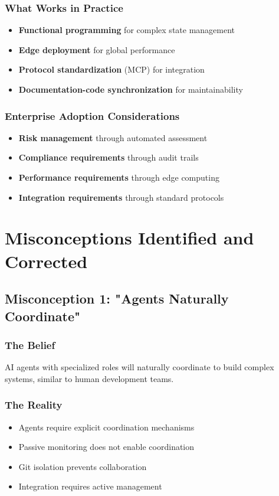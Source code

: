 \documentclass[11pt]{article}
\begin{document}
\subsubsection{What Works in Practice}
\label{sec:org6b02580}
\begin{itemize}
\item \textbf{\textbf{Functional programming}} for complex state management
\item \textbf{\textbf{Edge deployment}} for global performance
\item \textbf{\textbf{Protocol standardization}} (MCP) for integration
\item \textbf{\textbf{Documentation-code synchronization}} for maintainability
\end{itemize}
\subsubsection{Enterprise Adoption Considerations}
\label{sec:org112ac04}
\begin{itemize}
\item \textbf{\textbf{Risk management}} through automated assessment
\item \textbf{\textbf{Compliance requirements}} through audit trails
\item \textbf{\textbf{Performance requirements}} through edge computing
\item \textbf{\textbf{Integration requirements}} through standard protocols
\end{itemize}
\section{Misconceptions Identified and Corrected}
\label{sec:orgcfcc6d7}

\subsection{Misconception 1: "Agents Naturally Coordinate"}
\label{sec:orgc851f85}
\subsubsection{The Belief}
\label{sec:org4b80405}
AI agents with specialized roles will naturally coordinate to build complex systems, similar to human development teams.
\subsubsection{The Reality}
\label{sec:orge00f598}
\begin{itemize}
\item Agents require explicit coordination mechanisms
\item Passive monitoring does not enable coordination
\item Git isolation prevents collaboration
\item Integration requires active management
\end{itemize}
\end{document}
